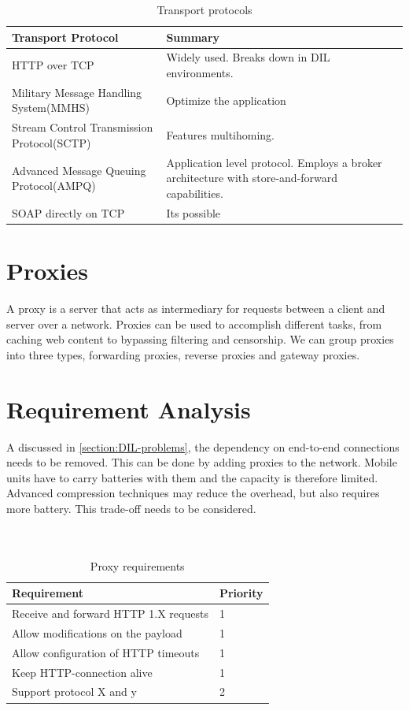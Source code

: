 \documentclass[USenglish]{article}
\begin{document}
\begin{table}[h]
\begin{tabularx}{\textwidth}{| X | X |}
\hline
  \textbf{Transport Protocol} & \textbf{Summary} \\ \hline
  HTTP over TCP & Widely used. Breaks down in DIL environments.\\ \hline
  Military Message Handling System(MMHS) & Optimize the application\\ \hline
  Stream Control Transmission Protocol(SCTP) & Features multihoming. \\ \hline
  Advanced Message Queuing Protocol(AMPQ) & Application level protocol. Employs a broker architecture with store-and-forward capabilities. \\ \hline
  SOAP directly on TCP & Its possible \\ \hline
\end{tabularx}
\caption{Transport protocols}
\end{table}

\section{Proxies}
A proxy is a server that acts as intermediary for requests between a client and server over a network. Proxies can be used to accomplish different tasks, from caching web content to bypassing filtering and censorship. We can group proxies into three types, forwarding proxies, reverse proxies and gateway proxies.

\section{Requirement Analysis}
A discussed in \cref{section:DIL-problems}, the dependency on end-to-end connections needs to be removed. This can be done by adding proxies to the network.
Mobile units have to carry batteries with them and the capacity is therefore limited. Advanced compression techniques may reduce the overhead, but also requires more battery. This trade-off needs to be considered.
\\ \\ \\
\begin{table}[h]
\begin{tabular}{| l | l |}
\hline
  \textbf{Requirement} & \textbf{Priority} \\ \hline
  Receive and forward HTTP 1.X requests & 1\\ \hline
  Allow modifications on the payload & 1 \\ \hline
  Allow configuration of HTTP timeouts & 1 \\ \hline
  Keep HTTP-connection alive & 1 \\ \hline
  Support protocol X and y & 2 \\ \hline
\end{tabular}
\caption{Proxy requirements}
\end{table}
\end{document}

